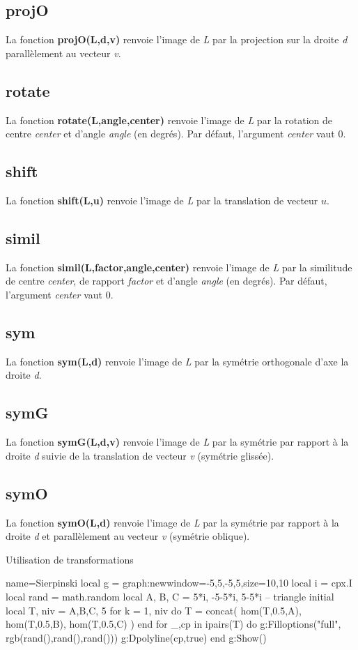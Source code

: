 \subsection{projO}
La fonction \textbf{projO(L,d,v)} renvoie l'image de \emph{L} par la projection sur la droite \emph{d} parallèlement au vecteur \emph{v}.

\subsection{rotate}
La fonction \textbf{rotate(L,angle,center)} renvoie l'image de \emph{L} par la rotation de centre \emph{center} et d'angle \emph{angle} (en degrés). Par défaut, l'argument \emph{center} vaut 0.  

\subsection{shift}
La fonction \textbf{shift(L,u)} renvoie l'image de \emph{L} par la translation de vecteur \(u\).

\subsection{simil}
La fonction \textbf{simil(L,factor,angle,center)} renvoie l'image de \emph{L} par la similitude de centre \emph{center}, de rapport \emph{factor} et d'angle \emph{angle} (en degrés). Par défaut, l'argument \emph{center} vaut 0.

\subsection{sym}
La fonction \textbf{sym(L,d)} renvoie l'image de \emph{L} par la symétrie orthogonale d'axe la droite \emph{d}.

\subsection{symG}
La fonction \textbf{symG(L,d,v)} renvoie l'image de \emph{L} par la symétrie par rapport à la droite \emph{d} suivie de la translation de vecteur \emph{v} (symétrie glissée).

\subsection{symO}
La fonction \textbf{symO(L,d)} renvoie l'image de \emph{L} par la symétrie par rapport à la droite \emph{d} et parallèlement au vecteur \emph{v} (symétrie oblique).

\begin{demo}{Utilisation de transformations}
\begin{luadraw}{name=Sierpinski}
local g = graph:new{window={-5,5,-5,5},size={10,10}}
local i = cpx.I
local rand = math.random
local A, B, C = 5*i, -5-5*i, 5-5*i -- triangle initial
local T, niv = {{A,B,C}}, 5
for k = 1, niv do
    T = concat( hom(T,0.5,A), hom(T,0.5,B), hom(T,0.5,C) )
end
for _,cp in ipairs(T) do
    g:Filloptions("full", rgb(rand(),rand(),rand()))
    g:Dpolyline(cp,true)
end
g:Show()
\end{luadraw}
\end{demo}

